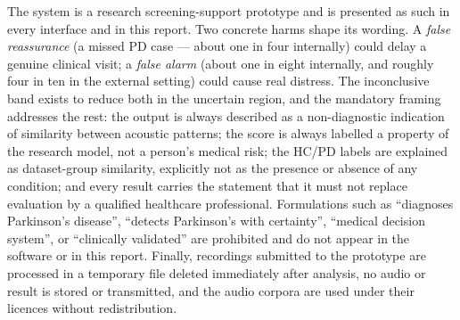 The system is a research screening-support prototype and is presented
as such in every interface and in this report. Two concrete harms
shape its wording. A \emph{false reassurance} (a missed PD case ---
about one in four internally) could delay a genuine clinical visit;
a \emph{false alarm} (about one in eight internally, and roughly four
in ten in the external setting) could cause real distress. The
inconclusive band exists to reduce both in the uncertain region, and
the mandatory framing addresses the rest: the output is always
described as a non-diagnostic indication of similarity between
acoustic patterns; the score is always labelled a property of the
research model, not a person's medical risk; the HC/PD labels are
explained as dataset-group similarity, explicitly not as the presence
or absence of any condition; and every result carries the statement
that it must not replace evaluation by a qualified healthcare
professional. Formulations such as ``diagnoses Parkinson's disease'',
``detects Parkinson's with certainty'', ``medical decision system'',
or ``clinically validated'' are prohibited and do not appear in the
software or in this report. Finally, recordings submitted to the
prototype are processed in a temporary file deleted immediately after
analysis, no audio or result is stored or transmitted, and the audio
corpora are used under their licences without redistribution.
